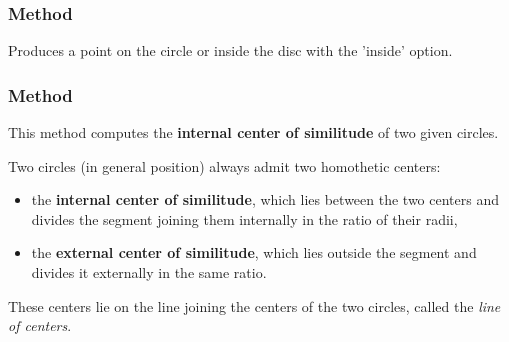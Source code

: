 \subsubsection{Method }
\label{ssub:method_imeth_circle_random_inside}
Produces a point on the circle or inside the disc with the 'inside' option.

\begin{minipage}{.5\textwidth}
\begin{center}
\end{center}
\end{minipage}
\begin{minipage}{.5\textwidth}
\begin{tkzexample}
\end{tkzexample}
\end{minipage}

\subsubsection{Method }
\label{ssub:method_circle_internal__similitude}

This method computes the \textbf{internal center of similitude} of two given circles.

\medskip

Two circles (in general position) always admit two homothetic centers:
\begin{itemize}
  \item the \textbf{internal center of similitude}, which lies between the two centers and divides the segment joining them internally in the ratio of their radii,
  \item the \textbf{external center of similitude}, which lies outside the segment and divides it externally in the same ratio.
\end{itemize}


These centers lie on the line joining the centers of the two circles, called the \emph{line of centers}.

